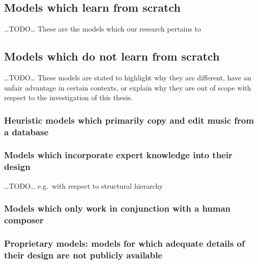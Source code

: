 \documentclass[12pt,a4paper,]{report}
\begin{document}
\hypertarget{models-which-learn-from-scratch}{%
\subsection{Models which learn from
scratch}\label{models-which-learn-from-scratch}}

\ldots TODO\ldots{} These are the models which our research pertains to

\hypertarget{models-which-do-not-learn-from-scratch}{%
\subsection{Models which do not learn from
scratch}\label{models-which-do-not-learn-from-scratch}}

\ldots TODO\ldots{} These models are stated to highlight why they are
different, have an unfair advantage in certain contexts, or explain why
they are out of scope with respect to the investigation of this thesis.

\hypertarget{heuristic-models-which-primarily-copy-and-edit-music-from-a-database}{%
\subsubsection{Heuristic models which primarily copy and edit music from
a
database}\label{heuristic-models-which-primarily-copy-and-edit-music-from-a-database}}

\hypertarget{models-which-incorporate-expert-knowledge-into-their-design}{%
\subsubsection{Models which incorporate expert knowledge into their
design}\label{models-which-incorporate-expert-knowledge-into-their-design}}

\ldots TODO\ldots{} e.g.~with respect to structural hierarchy

\hypertarget{models-which-only-work-in-conjunction-with-a-human-composer}{%
\subsubsection{Models which only work in conjunction with a human
composer}\label{models-which-only-work-in-conjunction-with-a-human-composer}}

\hypertarget{proprietary-models-models-for-which-adequate-details-of-their-design-are-not-publicly-available}{%
\subsubsection{Proprietary models: models for which adequate details of
their design are not publicly
available}\label{proprietary-models-models-for-which-adequate-details-of-their-design-are-not-publicly-available}}
\end{document}
